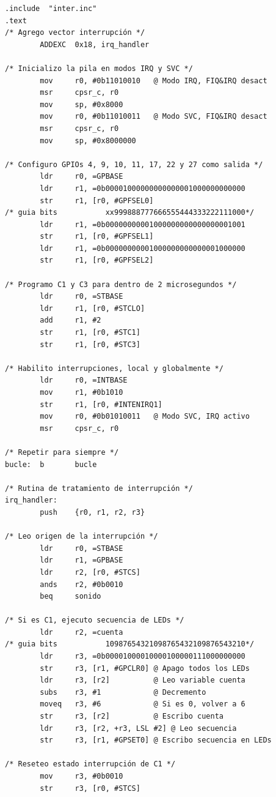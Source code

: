 \begin{lstlisting}[caption={inter4.s},label={lst:codigoPract5_4}]
        .include  "inter.inc"
.text
/* Agrego vector interrupción */
        ADDEXC  0x18, irq_handler

/* Inicializo la pila en modos IRQ y SVC */
        mov     r0, #0b11010010   @ Modo IRQ, FIQ&IRQ desact
        msr     cpsr_c, r0
        mov     sp, #0x8000
        mov     r0, #0b11010011   @ Modo SVC, FIQ&IRQ desact
        msr     cpsr_c, r0
        mov     sp, #0x8000000

/* Configuro GPIOs 4, 9, 10, 11, 17, 22 y 27 como salida */
        ldr     r0, =GPBASE
        ldr     r1, =0b00001000000000000001000000000000
        str     r1, [r0, #GPFSEL0]
/* guia bits           xx999888777666555444333222111000*/
        ldr     r1, =0b00000000001000000000000000001001
        str     r1, [r0, #GPFSEL1]
        ldr     r1, =0b00000000001000000000000001000000
        str     r1, [r0, #GPFSEL2]

/* Programo C1 y C3 para dentro de 2 microsegundos */
        ldr     r0, =STBASE
        ldr     r1, [r0, #STCLO]
        add     r1, #2
        str     r1, [r0, #STC1]
        str     r1, [r0, #STC3]

/* Habilito interrupciones, local y globalmente */
        ldr     r0, =INTBASE
        mov     r1, #0b1010
        str     r1, [r0, #INTENIRQ1]
        mov     r0, #0b01010011   @ Modo SVC, IRQ activo
        msr     cpsr_c, r0

/* Repetir para siempre */
bucle:  b       bucle

/* Rutina de tratamiento de interrupción */
irq_handler:
        push    {r0, r1, r2, r3}

/* Leo origen de la interrupción */
        ldr     r0, =STBASE
        ldr     r1, =GPBASE
        ldr     r2, [r0, #STCS]
        ands    r2, #0b0010
        beq     sonido

/* Si es C1, ejecuto secuencia de LEDs */
        ldr     r2, =cuenta
/* guia bits           10987654321098765432109876543210*/
        ldr     r3, =0b00001000010000100000111000000000
        str     r3, [r1, #GPCLR0] @ Apago todos los LEDs
        ldr     r3, [r2]          @ Leo variable cuenta
        subs    r3, #1            @ Decremento
        moveq   r3, #6            @ Si es 0, volver a 6
        str     r3, [r2]          @ Escribo cuenta
        ldr     r3, [r2, +r3, LSL #2] @ Leo secuencia
        str     r3, [r1, #GPSET0] @ Escribo secuencia en LEDs

/* Reseteo estado interrupción de C1 */
        mov     r3, #0b0010
        str     r3, [r0, #STCS]


\end{lstlisting}
